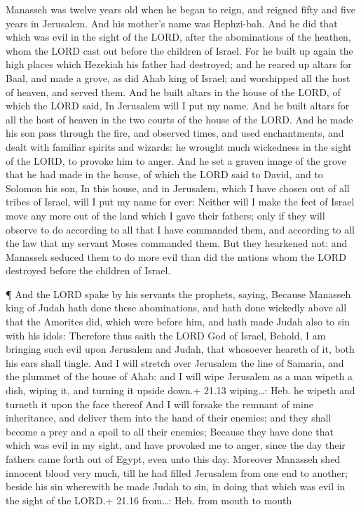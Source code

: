  Manasseh was twelve years old when he began to reign, and
reigned fifty and five years in Jerusalem. And his mother's name was
Hephzi-bah.  And he did that which was evil in the sight of
the LORD, after the abominations of the heathen, whom the LORD cast out
before the children of Israel.  For he built up again the
high places which Hezekiah his father had destroyed; and he reared up
altars for Baal, and made a grove, as did Ahab king of Israel; and
worshipped all the host of heaven, and served them.  And he
built altars in the house of the LORD, of which the LORD said, In
Jerusalem will I put my name.  And he built altars for all
the host of heaven in the two courts of the house of the LORD.
 And he made his son pass through the fire, and observed
times, and used enchantments, and dealt with familiar spirits and
wizards: he wrought much wickedness in the sight of the LORD, to provoke
him to anger.  And he set a graven image of the grove that
he had made in the house, of which the LORD said to David, and to
Solomon his son, In this house, and in Jerusalem, which I have chosen
out of all tribes of Israel, will I put my name for ever: 
Neither will I make the feet of Israel move any more out of the land
which I gave their fathers; only if they will observe to do according to
all that I have commanded them, and according to all the law that my
servant Moses commanded them.  But they hearkened not: and
Manasseh seduced them to do more evil than did the nations whom the LORD
destroyed before the children of Israel.

 ¶ And the LORD spake by his servants the prophets, saying,
 Because Manasseh king of Judah hath done these
abominations, and hath done wickedly above all that the Amorites did,
which were before him, and hath made Judah also to sin with his idols:
 Therefore thus saith the LORD God of Israel, Behold, I am
bringing such evil upon Jerusalem and Judah, that whosoever heareth of
it, both his ears shall tingle.  And I will stretch over
Jerusalem the line of Samaria, and the plummet of the house of Ahab: and
I will wipe Jerusalem as a man wipeth a dish, wiping it, and turning it
upside down.+ 21.13 wiping\ldots: Heb. he wipeth and turneth it upon the
face thereof  And I will forsake the remnant of mine
inheritance, and deliver them into the hand of their enemies; and they
shall become a prey and a spoil to all their enemies; 
Because they have done that which was evil in my sight, and have
provoked me to anger, since the day their fathers came forth out of
Egypt, even unto this day.  Moreover Manasseh shed innocent
blood very much, till he had filled Jerusalem from one end to another;
beside his sin wherewith he made Judah to sin, in doing that which was
evil in the sight of the LORD.+ 21.16 from\ldots: Heb. from mouth to
mouth


